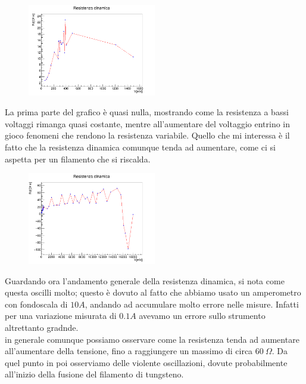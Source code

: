 \documentclass[10pt,twocolumn]{article}
\begin{document}
\begin{figure}[H] %
  \centering
  \includegraphics[width=0.5\textwidth]{curva_voltammetrica/resistenza_dinamica_zoom.png} %
  \label{fig:I_V_}
\end{figure}
La prima parte del grafico è quasi nulla, mostrando come la resistenza a bassi voltaggi rimanga quasi costante, mentre all'aumentare del voltaggio entrino in gioco fenomeni che rendono la resistenza variabile. 
Quello che mi interessa è il fatto che la resistenza dinamica comunque tenda ad aumentare, come ci si aspetta per un filamento che si riscalda.
\begin{figure}[H] %
  \centering
  \includegraphics[width=0.5\textwidth]{curva_voltammetrica/resistenza_dinamica.png} %
  \label{fig:I_V_}
\end{figure}
Guardando ora l'andamento generale della resistenza dinamica, si nota come questa oscilli molto; questo è dovuto al fatto che abbiamo usato un amperometro con fondoscala di $10 A$, andando ad accumulare molto errore nelle misure. Infatti per una variazione misurata di $0.1 A$ avevamo un errore sullo strumento altrettanto gradnde.\\
in generale comunque possiamo osservare come la resistenza tenda ad aumentare all'aumentare della tensione, fino a raggiungere un massimo di circa $60 \: \Omega$. 
Da quel punto in poi osserviamo delle violente oscillazioni, dovute probabilmente all'inizio della fusione del filamento di tungsteno. 
\end{document}
